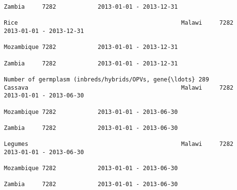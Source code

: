 \documentclass[11pt]{article}
\begin{document}
\begin{Verbatim}[commandchars=\\\{\}]
                                                                                                                                                                                                                 Zambia     7282            2013-01-01 - 2013-12-31   
                                                                                                                                                              Rice                                               Malawi     7282            2013-01-01 - 2013-12-31   
                                                                                                                                                                                                                 Mozambique 7282            2013-01-01 - 2013-12-31   
                                                                                                                                                                                                                 Zambia     7282            2013-01-01 - 2013-12-31   
                                                                         Number of germplasm (inbreds/hybrids/OPVs, gene{\ldots} 289                               Cassava                                            Malawi     7282            2013-01-01 - 2013-06-30   
                                                                                                                                                                                                                 Mozambique 7282            2013-01-01 - 2013-06-30   
                                                                                                                                                                                                                 Zambia     7282            2013-01-01 - 2013-06-30   
                                                                                                                                                              Legumes                                            Malawi     7282            2013-01-01 - 2013-06-30   
                                                                                                                                                                                                                 Mozambique 7282            2013-01-01 - 2013-06-30   
                                                                                                                                                                                                                 Zambia     7282            2013-01-01 - 2013-06-30   

\end{Verbatim}
\end{document}
